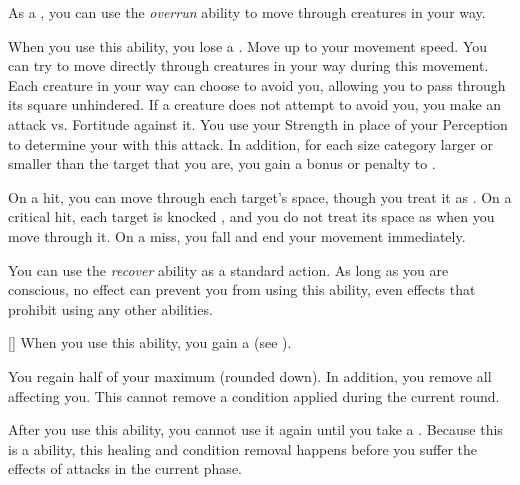          As a , you can use the \textit{overrun} ability to move through creatures in your way.

        \begin{freeability}{}
            When you use this ability, you lose a .
            Move up to your movement speed.
            You can try to move directly through creatures in your way during this movement.
            Each creature in your way can choose to avoid you, allowing you to pass through its square unhindered.
            If a creature does not attempt to avoid you, you make an attack vs. Fortitude against it.
            You use your Strength in place of your Perception to determine your  with this attack.
            In addition, for each size category larger or smaller than the target that you are, you gain a  bonus or penalty to .

            On a hit, you can move through each target's space, though you treat it as .
            On a critical hit, each target is knocked , and you do not treat its space as  when you move through it.
            On a miss, you fall  and end your movement immediately.
        \end{freeability}

         You can use the \textit{recover} ability as a standard action.
        As long as you are conscious, no effect can prevent you from using this ability, even effects that prohibit using any other abilities.
        \begin{freeability}{}[]
            When you use this ability, you gain a  (see ).

            You regain half of your maximum  (rounded down).
            In addition, you remove all  affecting you.
            This cannot remove a condition applied during the current round.

            After you use this ability, you cannot use it again until you take a .
            Because this is a  ability, this healing and condition removal happens before you suffer the effects of attacks in the current phase.
        \end{freeability}

